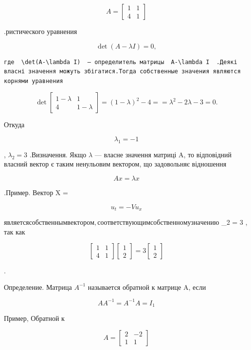\documentclass[
  ukrainian,
]{article}
\begin{document}
\[
A =
\begin{bmatrix} 1 & 1 \\ 4 & 1 \end{bmatrix}
\]

.ристического уравнения

\[
\det\left(A-\lambda I\right)=0,
\]

\begin{verbatim}
где  \det(A-\lambda I)  — определитель матрицы  A-\lambda I  .Деякі власні значення можуть збігатися.Тогда собственные значения являются корнями уравнения
\end{verbatim}

\[
\det
\begin{bmatrix} 1-\lambda & 1\\ 4 & 1-\lambda \end{bmatrix}
= (1-\lambda)^2 - 4 =
= \lambda^2 - 2\lambda - 3 = 0.
\]

Откуда

\[
\lambda_1 = -1
\]

, \(\lambda_2 = 3\) .Визначення. Якщо \(\lambda\) --- власне значення
матриці A, то відповідний власний вектор є таким ненульовим вектором, що
задовольняє відношення

\[
Ax = \lambda x
\]

.Пример. Вектор X =

\[
u_t = -Vu_x
\]

\(является собственным вектором, соответствующим собственному значению\)
\lambda\_2 = 3 , так как

\[
\begin{bmatrix} 1 & 1 \\ 4 & 1 \end{bmatrix}
\begin{bmatrix} 1 \\ 2 \end{bmatrix}
= 3
\begin{bmatrix} 1 \\ 2 \end{bmatrix}
\]

.

Определение. Матрица \(A^{-1}\) называется обратной к матрице A, если

\[
AA^{-1} = A^{-1}A = I_1
\]

Пример, Обратной к

\[
A =
\begin{bmatrix} 2 & -2 \\ 1 & 1 \end{bmatrix}
\]
\end{document}
